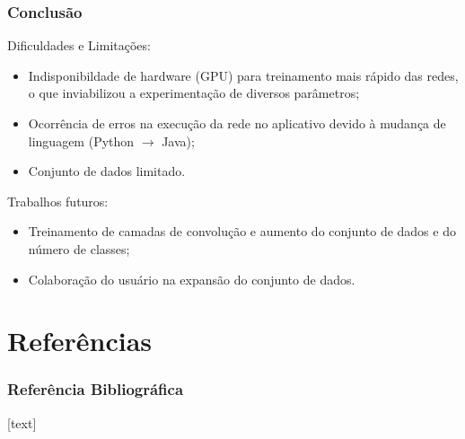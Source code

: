\documentclass{beamer}
\begin{document}
    \begin{frame}[t]
      \frametitle{Conclusão}
      Dificuldades e Limitações:
      \begin{itemize}
        \item<1-> Indisponibildade de hardware (GPU) para treinamento mais rápido das redes, o que inviabilizou 
        a experimentação de diversos parâmetros;
        \item<2-> Ocorrência de erros na execução da rede no aplicativo devido à mudança de linguagem (Python $\rightarrow${} Java);
	    \item<3-> Conjunto de dados limitado.  
      \end{itemize}
      
      \bigskip    
      {
      	Trabalhos futuros:
     	\begin{itemize}
        	\item<4-> Treinamento de camadas de convolução e aumento do conjunto de dados e do número de classes;
        	\item<5-> Colaboração do usuário na expansão do conjunto de dados.
      	\end{itemize}
      }
      
    \end{frame}
    
        
    \section{Referências}   
    \begin{frame}[allowframebreaks]
      \frametitle{Referência Bibliográfica}
      [text]
            
      

    \end{frame}
    
    
    
\end{document}
